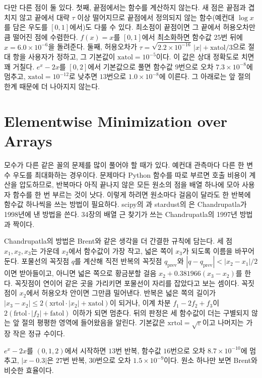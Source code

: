 다만 다른 점이 둘 있다. 첫째, 끝점에서는 함수를 계산하지 않는다. 새 점은 끝점과 겹치지 않고 끝에서 대략 $\tau$ 이상 떨어지므로 끝점에서 정의되지 않는 함수(예컨대 $\log x$를 담은 우도를 $[0,1]$에서)도 다룰 수 있다. 최소점이 끝점이면 그 끝에서 허용오차만큼 떨어진 점에 수렴한다. $f(x)=x$를 $[0,1]$에서 최소화하면 함수값 $25$번 뒤에 $x=6.0\times10^{-6}$을 돌려준다. 둘째, 허용오차가 $\tau=\sqrt{2.2\times10^{-16}}\,|x|+\mathrm{xatol}/3$으로 절대 항을 사용자가 정하고, 그 기본값이 $\mathrm{xatol}=10^{-5}$이다. 이 값은 상대 정확도로 치면 꽤 거칠다. $e^x-2x$를 $[0,2]$에서 기본값으로 풀면 함수값 $9$번으로 오차 $7.3\times10^{-8}$에 멈추고, $\mathrm{xatol}=10^{-12}$로 낮추면 $13$번으로 $1.0\times10^{-8}$에 이른다. 그 아래로는 앞 절의 한계 때문에 더 나아지지 않는다.

\section{Elementwise Minimization over Arrays}
\label{sec:batch-min}

모수가 다른 같은 꼴의 문제를 많이 풀어야 할 때가 있다. 예컨대 관측마다 다른 한 변수 우도를 최대화하는 경우이다. 문제마다 Python 함수를 따로 부르면 호출 비용이 계산을 압도하므로, 반복마다 아직 끝나지 않은 모든 원소의 점을 배열 하나에 모아 사용자 함수를 한 번 부르는 것이 낫다. 이렇게 하려면 원소마다 걸음이 달라도 한 반복에 함수값 하나씩을 쓰는 방법이 필요하다. scipy의 과 stardust의 은 Chandrupatla가 1998년에 낸 방법을 쓴다\cite{chandrupatla1998}. 34장의 배열 근 찾기가 쓰는 Chandrupatla의 1997년 방법과 짝이다.

Chandrupatla의 방법은 Brent와 같은 생각을 더 간결한 규칙에 담는다. 세 점 $x_1,x_2,x_3$는 가운데 $x_2$에서 함수값이 가장 작고, 넓은 쪽이 $x_3$가 되도록 이름을 바꾸어 둔다. 포물선의 꼭짓점 $q$를 계산해 직전 반복의 꼭짓점 $q_{\mathrm{prev}}$와 $|q-q_{\mathrm{prev}}|<|x_2-x_1|/2$이면 받아들이고, 아니면 넓은 쪽으로 황금분할 걸음 $x_2+0.381966(x_3-x_2)$를 한다. 꼭짓점이 연이어 같은 곳을 가리키면 포물선이 자리를 잡았다고 보는 셈이다. 꼭짓점이 $x_2$에서 허용오차 안이면 그만큼 밀어낸다. 반복은 넓은 쪽의 길이가 $|x_3-x_2|\le2(\mathrm{xrtol}\cdot|x_2|+\mathrm{xatol})$이 되거나, 이계 차분 $f_1-2f_2+f_3$이 $2(\mathrm{frtol}\cdot|f_2|+\mathrm{fatol})$ 이하가 되면 멈춘다. 뒤의 판정은 세 함수값이 더는 구별되지 않는 앞 절의 평평한 영역에 들어왔음을 알린다. 기본값은 $\mathrm{xrtol}=\sqrt\varepsilon$이고 나머지는 가장 작은 정규 수이다.

$e^x-2x$를 $(0,1,2)$에서 시작하면 $13$번 반복, 함수값 $16$번으로 오차 $8.7\times10^{-10}$에 멈추고, $|x-0.3|$은 $27$번 반복, $30$번으로 오차 $1.5\times10^{-9}$이다. 원소 하나만 보면 Brent와 비슷한 효율이다.

